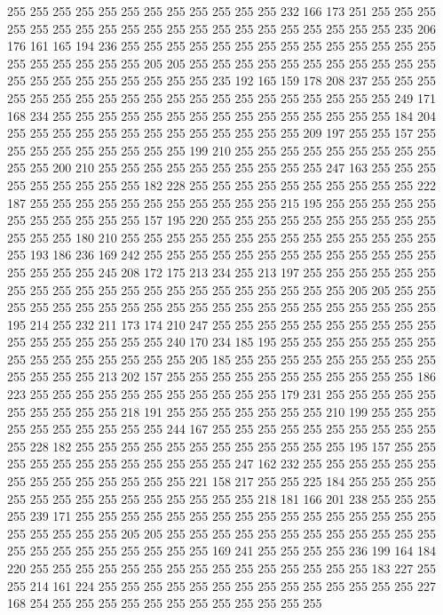 255 255 255 255 255 255 255 255 255 255 255 255 232 166 173 251 255 255 255 255
255 255 255 255 255 255 255 255 255 255 255 255 255 255 255 255 235 206 176 161
165 194 236 255 255 255 255 255 255 255 255 255 255 255 255 255 255 255 255 255
255 255 255 205 205 255 255 255 255 255 255 255 255 255 255 255 255 255 255 255
255 255 255 255 255 235 192 165 159 178 208 237 255 255 255 255 255 255 255 255
255 255 255 255 255 255 255 255 255 255 255 255 249 171 168 234 255 255 255 255
255 255 255 255 255 255 255 255 255 255 255 184 204 255 255 255 255 255 255 255
255 255 255 255 255 255 209 197 255 255 157 255 255 255 255 255 255 255 255 255
199 210 255 255 255 255 255 255 255 255 255 255 255 200 210 255 255 255 255 255
255 255 255 255 255 247 163 255 255 255 255 255 255 255 255 255 182 228 255 255
255 255 255 255 255 255 255 255 222 187 255 255 255 255 255 255 255 255 255 255
255 215 195 255 255 255 255 255 255 255 255 255 255 255 157 195 220 255 255 255
255 255 255 255 255 255 255 255 255 255 180 210 255 255 255 255 255 255 255 255
255 255 255 255 255 255 255 193 186 236 169 242 255 255 255 255 255 255 255 255
255 255 255 255 255 255 255 255 255 245 208 172 175 213 234 255 213 197 255 255
255 255 255 255 255 255 255 255 255 255 255 255 255 255 255 255 255 255 255 205
205 255 255 255 255 255 255 255 255 255 255 255 255 255 255 255 255 255 255 255
255 255 195 214 255 232 211 173 174 210 247 255 255 255 255 255 255 255 255 255
255 255 255 255 255 255 255 255 240 170 234 185 195 255 255 255 255 255 255 255
255 255 255 255 255 255 255 255 205 185 255 255 255 255 255 255 255 255 255 255
255 255 255 213 202 157 255 255 255 255 255 255 255 255 255 255 255 186 223 255
255 255 255 255 255 255 255 255 255 255 179 231 255 255 255 255 255 255 255 255
255 255 218 191 255 255 255 255 255 255 255 210 199 255 255 255 255 255 255 255
255 255 255 244 167 255 255 255 255 255 255 255 255 255 255 255 228 182 255 255
255 255 255 255 255 255 255 255 255 255 195 157 255 255 255 255 255 255 255 255
255 255 255 255 247 162 232 255 255 255 255 255 255 255 255 255 255 255 255 255
255 221 158 217 255 255 225 184 255 255 255 255 255 255 255 255 255 255 255 255
255 255 255 218 181 166 201 238 255 255 255 255 239 171 255 255 255 255 255 255
255 255 255 255 255 255 255 255 255 255 255 255 255 255 255 205 205 255 255 255
255 255 255 255 255 255 255 255 255 255 255 255 255 255 255 255 255 255 169 241
255 255 255 255 236 199 164 184 220 255 255 255 255 255 255 255 255 255 255 255
255 255 255 255 183 227 255 255 214 161 224 255 255 255 255 255 255 255 255 255
255 255 255 255 255 227 168 254 255 255 255 255 255 255 255 255 255 255 255 255
